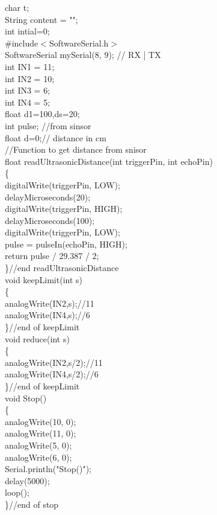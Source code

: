 \documentclass[12pt,a4paper]{report}
\begin{document}
char t;\\
String content = "";\\
int intial=0;\\
\#include$<$SoftwareSerial.h$>$ \\
SoftwareSerial mySerial(8, 9); // RX | TX\\
int IN1 = 11;\\
int IN2 = 10;\\
int IN3 = 6;\\
int IN4 = 5;\\
float d1=100,ds=20;\\
int pulse; //from sinsor\\
float d=0;// distance in cm\\
//Function to get distance from snisor\\
float readUltrasonicDistance(int triggerPin, int echoPin)\\
\{\\
  digitalWrite(triggerPin, LOW);\\
  delayMicroseconds(20);\\
  digitalWrite(triggerPin, HIGH);\\
  delayMicroseconds(100);\\
  digitalWrite(triggerPin, LOW);\\
  pulse = pulseIn(echoPin, HIGH);\\
  return pulse / 29.387 / 2;\\
\}//end readUltrasonicDistance\\

void keepLimit(int s)\\
\{\\
    analogWrite(IN2,s);//11\\
    analogWrite(IN4,s);//6\\
\}//end of keepLimit\\

void reduce(int s)\\
\{\\
    analogWrite(IN2,s/2);//11\\
    analogWrite(IN4,s/2);//6\\
\}//end of keepLimit\\
  
void Stop()\\
\{ \\
    analogWrite(10, 0);\\
    analogWrite(11, 0);\\
    analogWrite(5, 0);\\
    analogWrite(6, 0);\\
    Serial.println("Stop()");\\
    delay(5000);\\
    loop();\\
\}//end of stop\\
\end{document}
